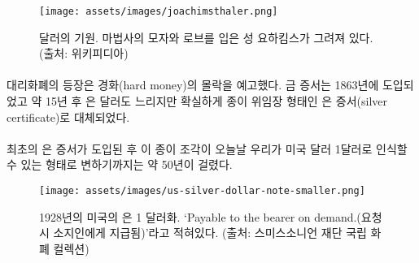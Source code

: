 \begin{figure}
	\centering
	\texttt{[image: assets/images/joachimsthaler.png]}
	\caption{달러의 기원. 마법사의 모자와 로브를 입은 성 요하킴스가 그려져 있다. (출처: 위키피디아)}
	\label{fig:joachimsthaler}
\end{figure}

\paragraph{}
\begin{comment}
	The introduction of representative money heralded the downfall of hard
	money. Gold certificates were introduced in 1863, and about fifteen
	years later, the silver dollar was also slowly but surely being replaced
	by a paper proxy: the silver certificate. \cite{wiki:silver-certificate}
\end{comment}
대리화폐의 등장은 경화(hard money)의 몰락을 예고했다. 
금 증서는 1863년에 도입되었고 약 15년 후 은 달러도 느리지만 확실하게 종이 위임장 형태인 은 증서(silver certificate)로 대체되었다.\cite{wiki:silver-certificate}

\paragraph{}
\begin{comment}
	It took about 50 years from the introduction of the first silver
	certificates until these pieces of paper morphed into something that we
	would today recognize as one U.S. dollar.
\end{comment}
최초의 은 증서가 도입된 후 이 종이 조각이 
오늘날 우리가 미국 달러 1달러로 인식할 수 있는 형태로 변하기까지는 약 50년이 걸렸다.

\begin{figure}
	\centering
	\texttt{[image: assets/images/us-silver-dollar-note-smaller.png]}
	\caption{1928년의 미국의 은 1 달러화. `Payable to the bearer on demand.(요청 시 소지인에게 지급됨)'라고 적혀있다. (출처: 스미스소니언 재단 국립 화폐 컬렉션)}
	\label{fig:us-silver-dollar-note-smaller}
\end{figure}

